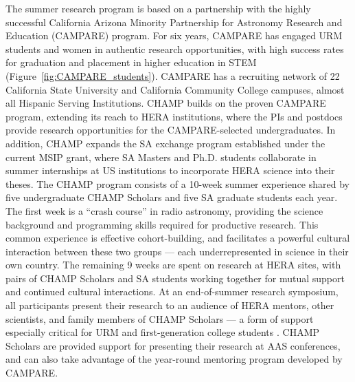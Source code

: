 \documentclass[preprint,11pt]{aastex}
\begin{document}
The summer
research program is based on a partnership with the highly successful
California Arizona Minority Partnership for Astronomy Research and Education
(CAMPARE) program. For six years, CAMPARE has engaged URM
students and women in authentic research
opportunities, with high success rates for graduation and placement 
in higher education in STEM (Figure~\ref{fig:CAMPARE_students}).  
CAMPARE has a recruiting network of 22 California State
University and California Community College campuses, almost all
Hispanic Serving Institutions.
CHAMP builds on the proven CAMPARE program, extending its reach to HERA institutions, where the  
PIs and postdocs
provide research opportunities for the CAMPARE-selected undergraduates.  In addition, CHAMP expands the SA exchange program
established under the current MSIP grant, where SA Masters and Ph.D. students
collaborate in summer internships at US institutions to incorporate HERA science into their theses.  
The CHAMP program consists of a 10-week summer experience shared by five
undergraduate CHAMP Scholars and five SA graduate students each year.
The first week is a ``crash course''
in radio astronomy, providing the science background
and programming skills required for productive
research. This common experience is effective cohort-building, 
and facilitates a powerful cultural interaction between these
two groups --- each underrepresented in science in their own country.
The remaining 9 weeks are spent on research at HERA sites, with 
pairs of CHAMP Scholars and SA students working together for mutual
support and continued cultural interactions. 
At an end-of-summer research symposium,
all participants present their research to an audience of
HERA mentors, other scientists, and 
family members of CHAMP Scholars --- a form of support
especially critical 
for URM and first-generation college students 
\citep{slovacek12}.
CHAMP Scholars are provided support for presenting their research at AAS conferences, and
can also take advantage of the year-round mentoring program 
developed by CAMPARE.
\end{document}
